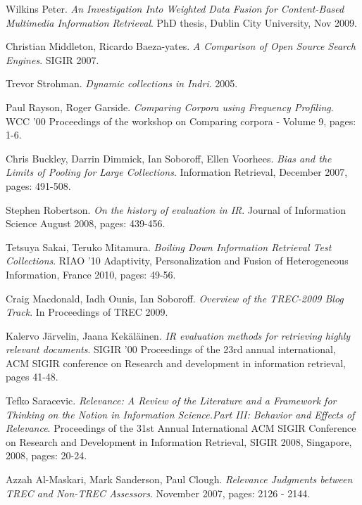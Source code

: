 \begin{thebibliography}{99}
			Wilkins Peter.
			\emph{An Investigation Into Weighted Data Fusion for Content-Based Multimedia Information Retrieval}.
			PhD thesis,
			Dublin City University,
			Nov 2009.


			Christian Middleton, Ricardo Baeza-yates.
			\emph{A Comparison of Open Source Search Engines}.
			SIGIR 2007.

			Trevor Strohman.
			\emph{Dynamic collections in Indri}.
			2005.


			Paul Rayson, Roger Garside.
			\emph{Comparing Corpora using Frequency Profiling}.
			WCC '00 Proceedings of the workshop on Comparing corpora - Volume 9,
			pages: 1-6.

			Chris Buckley, Darrin Dimmick, Ian Soboroff, Ellen Voorhees.
			\emph{Bias and the Limits of Pooling for Large Collections}.
			Information Retrieval,
			December 2007,
			pages: 491-508.

			Stephen Robertson.
			\emph{On the history of evaluation in IR}.
			Journal of Information Science
			August 2008,
			pages: 439-456.

			Tetsuya Sakai, Teruko Mitamura.
			\emph{Boiling Down Information Retrieval Test Collections}.
			RIAO '10 Adaptivity, Personalization and Fusion of Heterogeneous Information,
			France 2010,
			pages: 49-56.

			Craig Macdonald, Iadh Ounis, Ian Soboroff.
			\emph{Overview of the TREC-2009 Blog Track}.
			In Proceedings of TREC 2009.

			Kalervo Järvelin, Jaana Kekäläinen.
			\emph{IR evaluation methods for retrieving highly relevant documents}.
			SIGIR '00 Proceedings of the 23rd annual international,
			ACM SIGIR conference on Research and development in information retrieval,
			pages 41-48.

			Tefko Saracevic.
			\emph{Relevance: A Review of the Literature and a Framework for Thinking on the Notion in Information Science.Part III: Behavior and Effects of Relevance}.
			Proceedings of the 31st Annual International ACM SIGIR Conference on Research and Development in Information Retrieval,
			SIGIR 2008, Singapore,
			2008,
			pages: 20-24.

			Azzah Al-Maskari, Mark Sanderson, Paul Clough.
			\emph{Relevance Judgments between TREC and Non-TREC Assessors}.
			November 2007,
			pages: 2126 - 2144.


\end{thebibliography}
